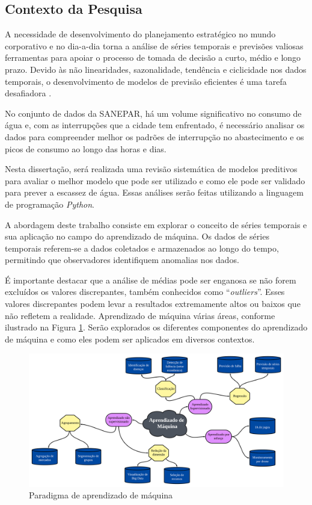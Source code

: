 \subsection{Contexto da Pesquisa} \label{subsec:contexto}
A necessidade de desenvolvimento do planejamento estratégico no mundo corporativo e no dia-a-dia torna a análise de séries temporais e previsões valiosas ferramentas para apoiar o processo de tomada de decisão a curto, médio e longo prazo. Devido às não linearidades, sazonalidade, tendência e ciclicidade nos dados temporais, o desenvolvimento de modelos de previsão eficientes é uma tarefa desafiadora \cite{mateus}.

No conjunto de dados da SANEPAR, há um volume significativo no consumo de água e, com as interrupções que a cidade tem enfrentado, é necessário analisar os dados para compreender melhor os padrões de interrupção no abastecimento e os picos de consumo ao longo das horas e dias.

Nesta dissertação, será realizada uma revisão sistemática de modelos preditivos para avaliar o melhor modelo que pode ser utilizado e como ele pode ser validado para prever a escassez de água. Essas análises serão feitas utilizando a linguagem de programação \textit{Python}.

A abordagem deste trabalho consiste em explorar o conceito de séries temporais e sua aplicação no campo do aprendizado de máquina. Os dados de séries temporais referem-se a dados coletados e armazenados ao longo do tempo, permitindo que observadores identifiquem anomalias nos dados.

É importante destacar que a análise de médias pode ser enganosa se não forem excluídos os valores discrepantes, também conhecidos como ``\textit{outliers}''. Esses valores discrepantes podem levar a resultados extremamente altos ou baixos que não refletem a realidade.
Aprendizado de máquina várias áreas, conforme ilustrado na Figura \ref{fig:paradigma-ml}. Serão explorados os diferentes componentes do aprendizado de máquina e como eles podem ser aplicados em diversos contextos.
 
\begin{figure}[H]
	\centering
	\caption{Paradigma de aprendizado de máquina}
	\includegraphics[width=\linewidth]{Introducao/Figuras/paradigma-ml}
	
	\label{fig:paradigma-ml}
\end{figure}
  
